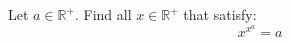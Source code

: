 Let $a \in \mathbb{R}^{+}$.
Find all $x \in \mathbb{R}^{+}$ that satisfy:
\begin{equation*}
  x^{x^{a}} = a
\end{equation*}
